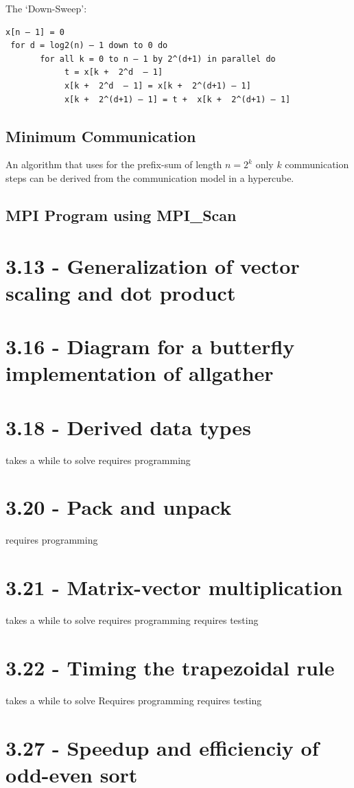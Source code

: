 \documentclass[a4paper,11pt,twoside]{article}
\begin{document}
The `Down-Sweep':
\begin{verbatim}
x[n – 1] = 0
 for d = log2(n) – 1 down to 0 do 
       for all k = 0 to n – 1 by 2^(d+1) in parallel do 
            t = x[k +  2^d  – 1]
            x[k +  2^d  – 1] = x[k +  2^(d+1) – 1]
            x[k +  2^(d+1) – 1] = t +  x[k +  2^(d+1) – 1]

\end{verbatim}

\subsection*{Minimum Communication}
An algorithm that uses for the prefix-sum of length $n = 2^k$ only $k$ communication steps can be derived from the communication model in a hypercube.

\subsection*{MPI Program using MPI_Scan}



\section{3.13 - Generalization of vector scaling and dot product}




\section{3.16 - Diagram for a butterfly implementation of allgather}

\section{3.18 - Derived data types}
takes a while to solve
requires programming

\section{3.20 - Pack and unpack}
requires programming


\section{3.21 - Matrix-vector multiplication}
takes a while to solve
requires programming
requires testing

\section{3.22 - Timing the trapezoidal rule}
takes a while to solve
Requires programming
requires testing

\section{3.27 - Speedup and efficienciy of odd-even sort}



\end{document}
